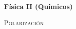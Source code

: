 \documentclass[11pt,spanish,a4paper,twoside]{article}
\begin{document}
\noindent
\textbf{Física II (Químicos)}\hfill {}
\begin{center}
  \textsc{\large Polarización}
\par\end{center}{\large \par}

%
\end{document}
